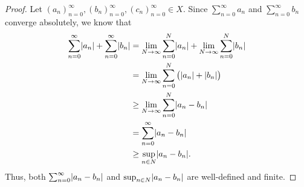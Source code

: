 \begin{proof}
  Let \((a_n)_{n = 0}^\infty, (b_n)_{n = 0}^\infty, (c_n)_{n = 0}^\infty \in X\).
  Since \(\sum_{n = 0}^\infty a_n\) and \(\sum_{n = 0}^\infty b_n\) converge absolutely, we know that
  \begin{align*}
    \sum_{n = 0}^\infty \abs{a_n} + \sum_{n = 0}^\infty \abs{b_n} & = \lim_{N \to \infty} \sum_{n = 0}^N \abs{a_n} + \lim_{N \to \infty} \sum_{n = 0}^N \abs{b_n} \\
                                                                  & = \lim_{N \to \infty} \sum_{n = 0}^N \big(\abs{a_n} + \abs{b_n}\big)                          \\
                                                                  & \geq \lim_{N \to \infty} \sum_{n = 0}^N \abs{a_n - b_n}                                       \\
                                                                  & = \sum_{n = 0}^\infty \abs{a_n - b_n}                                                         \\
                                                                  & \geq \sup_{n \in N} \abs{a_n - b_n}.
  \end{align*}
  Thus, both \(\sum_{n = 0}^\infty \abs{a_n - b_n}\) and \(\sup_{n \in N} \abs{a_n - b_n}\) are well-defined and finite.


\end{proof}
